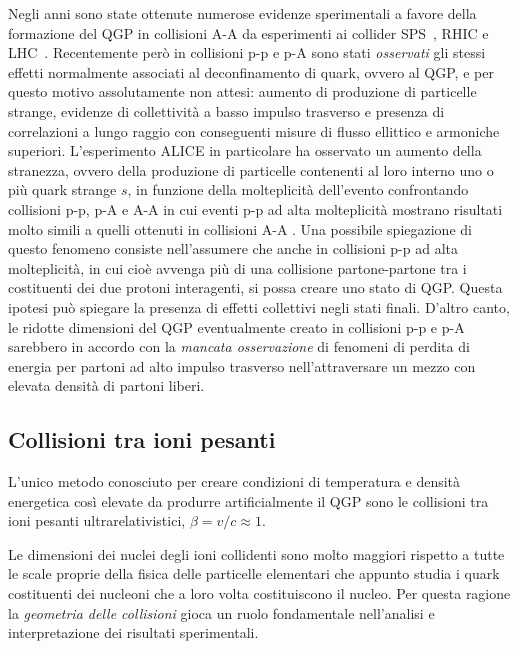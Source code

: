 Negli anni sono state ottenute numerose evidenze sperimentali a favore della formazione del QGP in collisioni A-A da esperimenti ai collider SPS~\cite{NA60_2021}, RHIC e LHC~\cite{ALICE_2024}. Recentemente però in collisioni p-p e p-A sono stati \textit{osservati} gli stessi effetti normalmente associati al deconfinamento di quark, ovvero al QGP, e per questo motivo assolutamente non attesi: aumento di produzione di particelle strange, evidenze di collettività a basso impulso trasverso e presenza di correlazioni a lungo raggio con conseguenti misure di flusso ellittico e armoniche superiori. L'esperimento ALICE in particolare ha osservato un aumento della stranezza, ovvero della produzione di particelle contenenti al loro interno uno o più quark strange $s$, in funzione della molteplicità dell'evento \cite{ALICE_2008} confrontando collisioni p-p, p-A e A-A in cui eventi p-p ad alta molteplicità mostrano risultati molto simili a quelli ottenuti in collisioni A-A \cite{RHIC_2020} \cite{ALICE_pp_2017} \cite{ALICE_pp_pPb_pBPb_2024}. Una possibile spiegazione di questo fenomeno consiste nell'assumere che anche in collisioni p-p ad alta molteplicità, in cui cioè avvenga più di una collisione partone-partone tra i costituenti dei due protoni interagenti, si possa creare uno stato di QGP. Questa ipotesi può spiegare la presenza di effetti collettivi negli stati finali. D'altro canto, le ridotte dimensioni del QGP eventualmente creato in collisioni p-p e p-A sarebbero in accordo con la \textit{mancata osservazione} di fenomeni di perdita di energia per partoni ad alto impulso trasverso nell'attraversare un mezzo con elevata densità di partoni liberi.

    \subsection{Collisioni tra ioni pesanti}
        L'unico metodo conosciuto per creare condizioni di temperatura e densità energetica così elevate da produrre artificialmente il QGP sono le collisioni tra ioni pesanti ultrarelativistici, $\beta = v/c \approx 1$.

        Le dimensioni dei nuclei degli ioni collidenti sono molto maggiori rispetto a tutte le scale proprie della fisica delle particelle elementari che appunto studia i quark costituenti dei nucleoni che a loro volta costituiscono il nucleo. Per questa ragione la \textit{geometria delle collisioni} gioca un ruolo fondamentale nell'analisi e interpretazione dei risultati sperimentali.

